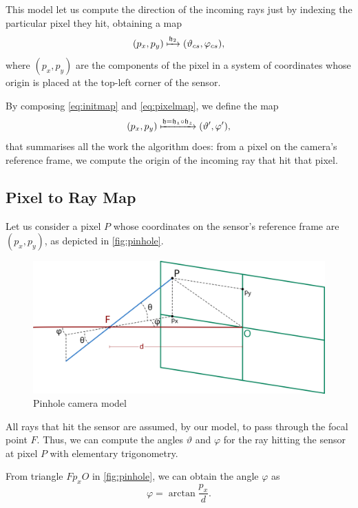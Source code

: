 This model let us compute the direction of the incoming rays just by indexing the particular pixel they hit, obtaining a map
\begin{equation}
	\label{eq:pixelmap}
	(p_x, p_y) \xmapsto{\mathfrak{h}_2} (\vartheta_{cs}, \varphi_{cs}),
\end{equation}
where $(p_x, p_y)$ are the components of the pixel in a system of coordinates whose origin is placed at the top-left corner of the sensor.

By composing \autoref{eq:initmap} and \autoref{eq:pixelmap}, we define the map
\begin{equation}
	(p_x, p_y) \xmapsto{\mathfrak{h} = \mathfrak{h_1}\circ\mathfrak{h_2}} (\vartheta', \varphi'),
\end{equation}
that summarises all the work the algorithm does: from a pixel on the camera's reference frame, we compute the origin of the incoming ray that hit that pixel.

\subsection{Pixel to Ray Map}
\label{subcsec:pixeltoray}

Let us consider a pixel $P$ whose coordinates on the sensor's reference frame are $(p_x, p_y)$, as depicted in \autoref{fig:pinhole}.

\begin{figure}[bth]
	\myfloatalign
	\includegraphics[width=.8\linewidth]{gfx/pinhole.png}
	\caption[Pinhole camera model]{Pinhole camera model}
	\label{fig:pinhole}
\end{figure}

All rays that hit the sensor are assumed, by our model, to pass through the focal point $F$. Thus, we can compute the angles $\vartheta$ and $\varphi$ for the ray hitting the sensor at pixel $P$ with elementary trigonometry.

From triangle $Fp_xO$ in \autoref{fig:pinhole}, we can obtain the angle $\varphi$ as
\[
	\varphi = \arctan{\frac{p_x}{d}}.
\]

